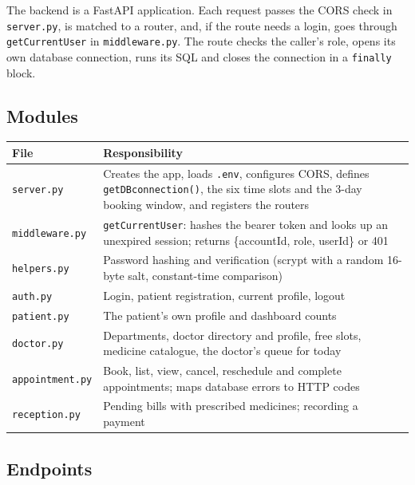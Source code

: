 \documentclass[11pt,a4paper]{article}
\newcommand{\code}[1]{\texttt{#1}}
\begin{document}
The backend is a FastAPI application. Each request passes the CORS check in \code{server.py}, is matched to a router, and, if the route needs a login, goes through \code{getCurrentUser} in \code{middleware.py}. The route checks the caller's role, opens its own database connection, runs its SQL and closes the connection in a \code{finally} block.

\subsection{Modules}

\begin{center}
\small
\begin{tabularx}{\textwidth}{l L}
\toprule
\textbf{File} & \textbf{Responsibility} \\
\midrule
\code{server.py}      & Creates the app, loads \code{.env}, configures CORS, defines \code{getDBconnection()}, the six time slots and the 3-day booking window, and registers the routers \\
\code{middleware.py}  & \code{getCurrentUser}: hashes the bearer token and looks up an unexpired session; returns \{accountId, role, userId\} or 401 \\
\code{helpers.py}     & Password hashing and verification (scrypt with a random 16-byte salt, constant-time comparison) \\
\code{auth.py}        & Login, patient registration, current profile, logout \\
\code{patient.py}     & The patient's own profile and dashboard counts \\
\code{doctor.py}      & Departments, doctor directory and profile, free slots, medicine catalogue, the doctor's queue for today \\
\code{appointment.py} & Book, list, view, cancel, reschedule and complete appointments; maps database errors to HTTP codes \\
\code{reception.py}   & Pending bills with prescribed medicines; recording a payment \\
\bottomrule
\end{tabularx}
\end{center}

\subsection{Endpoints}
\end{document}
